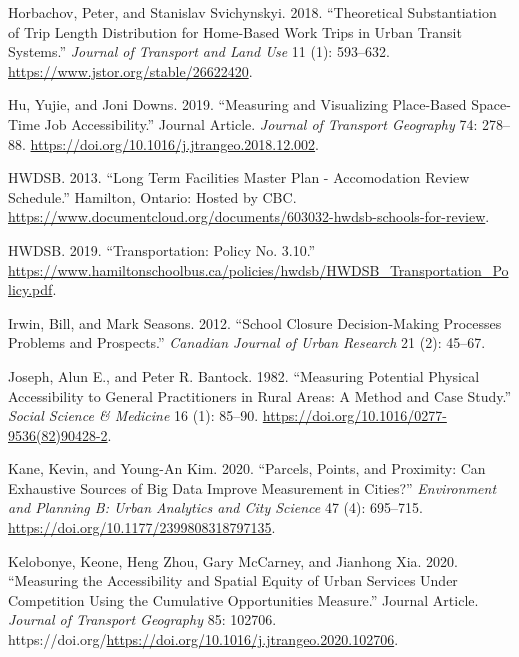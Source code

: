 \documentclass[
default
]{sn-jnl}
\newlength{\cslhangindent}
\newenvironment{CSLReferences}[2] %
 {\begin{list}{}{%
  \setlength{\itemindent}{0pt}
  \setlength{\leftmargin}{0pt}
  \setlength{\parsep}{0pt}
  \ifodd #1
   \setlength{\leftmargin}{\cslhangindent}
   \setlength{\itemindent}{-1\cslhangindent}
  \fi
  \setlength{\itemsep}{#2\baselineskip}}}
 {\end{list}}
\begin{document}
\begin{CSLReferences}{1}{0}
Horbachov, Peter, and Stanislav Svichynskyi. 2018. {``Theoretical
Substantiation of Trip Length Distribution for Home-Based Work Trips in
Urban Transit Systems.''} \emph{Journal of Transport and Land Use} 11
(1): 593--632. \url{https://www.jstor.org/stable/26622420}.

Hu, Yujie, and Joni Downs. 2019. {``Measuring and Visualizing
Place-Based Space-Time Job Accessibility.''} Journal Article.
\emph{Journal of Transport Geography} 74: 278--88.
\url{https://doi.org/10.1016/j.jtrangeo.2018.12.002}.

HWDSB. 2013. {``Long Term Facilities Master Plan - Accomodation Review
Schedule.''} Hamilton, Ontario: Hosted by {CBC}.
\url{https://www.documentcloud.org/documents/603032-hwdsb-schools-for-review}.

HWDSB. 2019. {``Transportation: Policy No. 3.10.''}
\url{https://www.hamiltonschoolbus.ca/policies/hwdsb/HWDSB_Transportation_Policy.pdf}.

Irwin, Bill, and Mark Seasons. 2012. {``School {Closure Decision-Making
Processes Problems} and {Prospects}.''} \emph{Canadian Journal of Urban
Research} 21 (2): 45--67.

Joseph, Alun E., and Peter R. Bantock. 1982. {``Measuring Potential
Physical Accessibility to General Practitioners in Rural Areas: A Method
and Case Study.''} \emph{Social Science \& Medicine} 16 (1): 85--90.
\url{https://doi.org/10.1016/0277-9536(82)90428-2}.

Kane, Kevin, and Young-An Kim. 2020. {``Parcels, Points, and Proximity:
Can Exhaustive Sources of Big Data Improve Measurement in Cities?''}
\emph{Environment and Planning B: Urban Analytics and City Science} 47
(4): 695--715. \url{https://doi.org/10.1177/2399808318797135}.

Kelobonye, Keone, Heng Zhou, Gary McCarney, and Jianhong Xia. 2020.
{``Measuring the Accessibility and Spatial Equity of Urban Services
Under Competition Using the Cumulative Opportunities Measure.''} Journal
Article. \emph{Journal of Transport Geography} 85: 102706.
https://doi.org/\url{https://doi.org/10.1016/j.jtrangeo.2020.102706}.


\end{CSLReferences}
\end{document}
